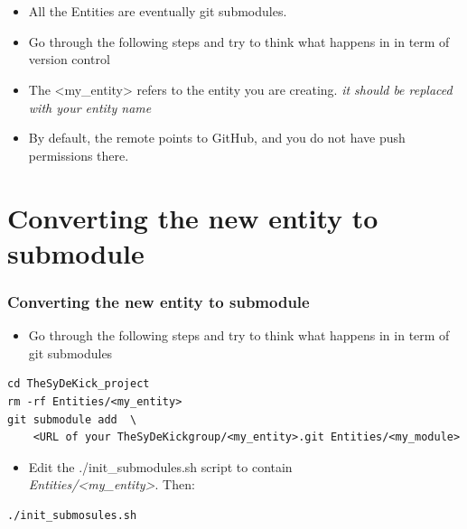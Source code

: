 \documentclass{sdkslides}
\begin{document}
\section*{\sectionname}
\begin{frame}[t,fragile]
    \frametitle{\sectionname} 
    \begin{itemize}
        \item All the Entities are eventually git submodules.
        \item Go through the following steps and try to think what happens in
            in term of version control
        \item The <my\_entity> refers to the entity you are creating. \emph{it should be
            replaced with your entity name}
        \item By default, the remote points to GitHub, and you do not have
            push permissions there.
        \end{itemize}
\end{frame}

\renewcommand{\sectionname}{Converting the new entity to submodule}
\section*{\sectionname}
\begin{frame}[t,fragile]
    \frametitle{\sectionname} 
    \begin{itemize}
        \item Go through the following steps and try to think what happens in
            in term of git submodules
    \end{itemize}
\begin{lstlisting}
cd TheSyDeKick_project
rm -rf Entities/<my_entity>
git submodule add  \
    <URL of your TheSyDeKickgroup/<my_entity>.git Entities/<my_module>
\end{lstlisting}
    \begin{itemize}
        \item Edit the ./init\_submodules.sh script to contain\\
            \emph{Entities/<my\_entity>}. Then:
    \end{itemize}
\begin{lstlisting}
./init_submosules.sh
\end{lstlisting}
\end{frame}
\end{document}
